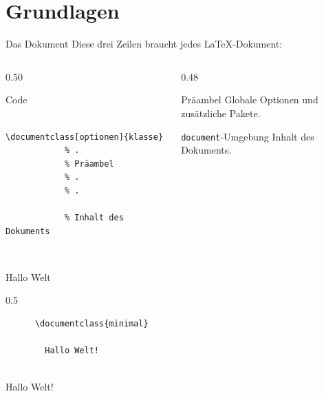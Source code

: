 \section{Grundlagen}

\begin{frame}[fragile]{Das Dokument}
  Diese drei Zeilen braucht jedes \LaTeX-Dokument:
  \begin{columns}[onlytextwidth, t]
    \begin{column}{0.50\textwidth}
      \begin{block}{Code}
        \begin{verbatim}
          \documentclass[optionen]{klasse}
            % .
            % Präambel
            % .
            % .
          
            % Inhalt des Dokuments
          
        \end{verbatim}
      \end{block}
    \end{column}
    \begin{column}{0.48\textwidth}
      \begin{block}{Präambel}
        Globale Optionen und zusätzliche Pakete.
      \end{block}
      \begin{block}{\texttt{document}-Umgebung}
        Inhalt des Dokuments.
      \end{block}
    \end{column}
  \end{columns}
\end{frame}

\begin{frame}[fragile]{Hallo Welt}
  \begin{CodeExample}{0.5}
    \begin{verbatim}
      \documentclass{minimal}
      
        Hallo Welt!
      
    \end{verbatim}
  \CodeResult
    \begin{minipage}[c][4\baselineskip][c]{\textwidth}
      \strut
      Hallo Welt!
    \end{minipage}
  \end{CodeExample}
\end{frame}

